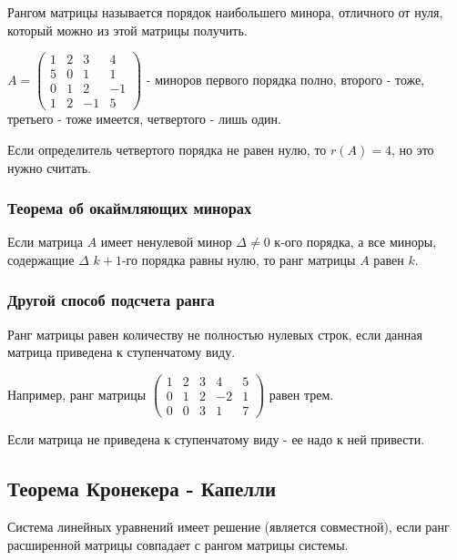 \documentclass{article}
\begin{document}
\begin{flushleft}

Рангом матрицы называется порядок наибольшего минора, отличного от нуля, который можно из этой матрицы получить.

\hfill

$A = \begin{pmatrix}
    1 & 2 & 3 & 4 \\
    5 & 0 & 1 & 1 \\
    0 & 1 & 2 & -1 \\
    1 & 2 & -1 & 5
\end{pmatrix}$ - миноров первого порядка полно, второго - тоже, третьего - тоже имеется, четвертого - лишь один.

Если определитель четвертого порядка не равен нулю, то $r(A) = 4$, но это нужно считать.

\subsubsection{Теорема об окаймляющих минорах}

Если матрица $A$ имеет ненулевой минор $\Delta \ne 0$ к-ого порядка, а все миноры, содержащие $\Delta$ $k + 1$-го порядка равны нулю, то ранг матрицы $A$ равен $k$.

\subsubsection{Другой способ подсчета ранга}

Ранг матрицы равен количеству не полностью нулевых строк, если данная матрица приведена к ступенчатому виду.

\hfill

Например, ранг матрицы $\begin{pmatrix}
    1 & 2 & 3 & 4 & 5 \\
    0 & 1 & 2 & -2 & 1 \\
    0 & 0 & 3 & 1 & 7
\end{pmatrix}$ равен трем.

\hfill

Если матрица не приведена к ступенчатому виду - ее надо к ней привести.

\subsection{Теорема Кронекера - Капелли}

Система линейных уравнений имеет решение (является совместной), если ранг расширенной матрицы совпадает с рангом матрицы системы.


\end{flushleft}
\end{document}
